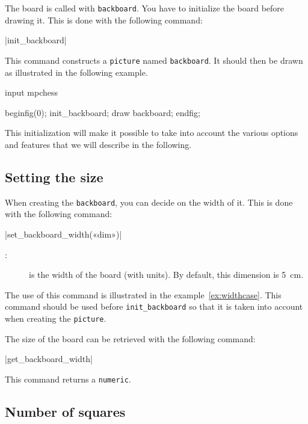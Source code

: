 \documentclass[english]{ltxdoc}
\begin{document}
The board is called with \mpchess{} \lstinline+backboard+.
You have to initialize the board before drawing it. This is done with the
following command:\par

\commande|init_backboard|\smallskip{}

This command constructs a \MP{} \lstinline+picture+ named
\mbox{\lstinline+backboard+.} It should then be drawn as illustrated in the following example.
\begin{ExempleMP}
input mpchess

beginfig(0);
init_backboard;
draw backboard;
endfig;
\end{ExempleMP}

This initialization will make it possible to take into account the various options and features that we will describe in the following.

\subsection{Setting the size}

When creating the \lstinline+backboard+, you can decide on the width of it. This is done with the following command:\par\bigskip

\commande|set_backboard_width(«dim»)|\smallskip{}

\begin{description}
  \item[:] is the width of the board (with units). By default, this dimension is \SI{5}{cm}.
\end{description}

The use of this command is illustrated in the example~\ref{ex:widthcase}. This
command should be used before \lstinline+init_backboard+ so that it is taken
into account when creating the \lstinline+picture+. 
\bigskip

The size of the board can be retrieved with the following command:

\commande|get_backboard_width|\smallskip{}

This command returns a \lstinline+numeric+.

\subsection{Number of squares}
\end{document}
